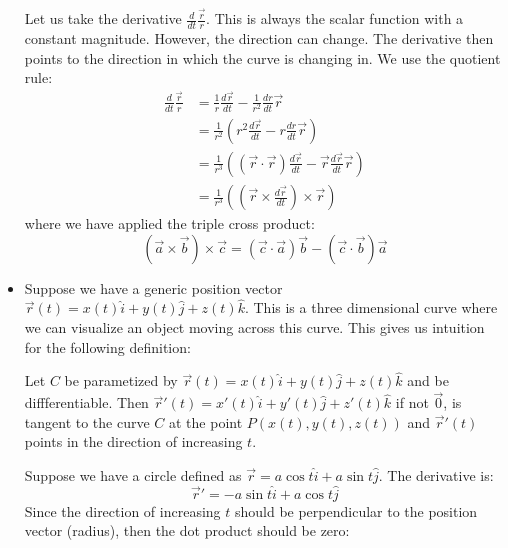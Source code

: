 \begin{itemize}
    \begin{example}
        Let us take the derivative $\frac{d}{dt} \frac{\vec{r}}{r}$. This is always the scalar function with a constant magnitude. However, the direction can change. The derivative then points to the direction in which the curve is changing in. We use the quotient rule:
        \begin{align}
            \frac{d}{dt} \frac{\vec{r}}{r} &= \frac{1}{r} \frac{d\vec{r}}{dt} - \frac{1}{r^2} \frac{dr}{dt} \vec{r} \\ 
            &= \frac{1}{r^2}\left(r^2 \frac{d\vec{r}}{dt} - r\frac{dr}{dt}\vec{r}\right) \\ 
            &= \frac{1}{r^3}\left((\vec{r}\cdot\vec{r}) \frac{d\vec{r}}{dt} - \vec{r} \frac{d\vec{r}}{dt} \vec{r}\right) \\ 
            &= \frac{1}{r^3}\left((\vec{r} \times \frac{d\vec{r}}{dt}) \times \vec{r}\right)
        \end{align}
        where we have applied the triple cross product:
        \begin{equation}
            (\vec{a} \times \vec{b}) \times \vec{c} = (\vec{c} \cdot \vec{a})\vec{b} - (\vec{c} \cdot \vec{b})\vec{a}
        \end{equation}
    \end{example}
    \item Suppose we have a generic position vector $\vec{r}(t) = x(t)\hat{i} + y(t)\hat{j}+z(t)\hat{k}$. This is a three dimensional curve where we can visualize an object moving across this curve. This gives us intuition for the following definition:
    \begin{definition}
        Let $C$ be parametized by $\vec{r}(t) = x(t) \hat{i} + y(t)\hat{j} +z(t)\hat{k}$ and be diffferentiable. Then $\vec{r}'(t)= x'(t)\hat{i}+y'(t)\hat{j}+z'(t)\hat{k}$ if not $\vec{0}$, is tangent to the curve $C$ at the point $P(x(t), y(t), z(t))$ and $\vec{r}'(t)$ points in the direction of increasing $t$.
    \end{definition}
    \begin{example}
        Suppose we have a circle defined as $\vec{r} = a\cos t\hat{i} + a\sin t\hat{j}$. The derivative is:
        \begin{equation}
            \vec{r}' = -a\sin t \hat{i} + a\cos t\hat{j}
        \end{equation}
        Since the direction of increasing $t$ should be perpendicular to the position vector (radius), then the dot product should be zero:
        \begin{equation}

\end{equation}
\end{example}
\end{itemize}
